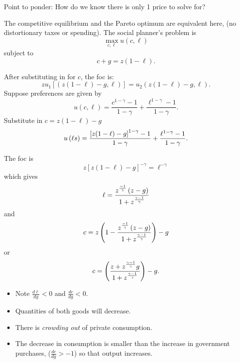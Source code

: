 \documentclass{sebase}
\begin{document}
Point to ponder: How do we know there is only 1 price to solve for?

\pagebreak

The competitive equilibrium and the Pareto optimum are equivalent here, (no
distortionary taxes or spending). The social planner's problem is 
\begin{equation*}
\underset{c,\ell }{\max }u\left( c,\ell \right)
\end{equation*}%
subject to 
\begin{equation*}
c+g=z(1-\ell ).
\end{equation*}

After substituting in for $c$, the foc is: 
\begin{equation*}
zu_{1}\left[ \left( z\left( 1-\ell \right) -g,\ell \right) \right]
=u_{2}\left( z\left( 1-\ell \right) -g,\ell \right) .
\end{equation*}%
Suppose preferences are given by 
\begin{equation*}
u\left( c,\ell \right) =\frac{c^{1-\gamma }-1}{1-\gamma }+\frac{\ell
^{1-\gamma }-1}{1-\gamma }.
\end{equation*}%
Substitute in $c=z(1-\ell )-g$ 
\begin{equation*}
u\left( \ell s\right) =\frac{\left[ z(1-\ell )-g\right] ^{1-\gamma }-1}{%
1-\gamma }+\frac{\ell ^{1-\gamma }-1}{1-\gamma }.
\end{equation*}%
\pagebreak

The foc is%
\begin{equation*}
z\left[ z(1-\ell )-g\right] ^{-\gamma }=\ell ^{-\gamma }
\end{equation*}%
which gives 
\begin{equation*}
\ell =\frac{z^{\frac{-1}{\gamma }}\left( z-g\right) }{1+z^{\frac{\gamma -1}{%
\gamma }}}
\end{equation*}%
and%
\begin{equation*}
c=z\left( 1-\frac{z^{\frac{-1}{\gamma }}\left( z-g\right) }{1+z^{\frac{%
\gamma -1}{\gamma }}}\right) -g
\end{equation*}%
or%
\begin{equation*}
c=\left( \frac{z+z^{\frac{\gamma -1}{\gamma }}g}{1+z^{\frac{\gamma -1}{%
\gamma }}}\right) -g.
\end{equation*}%
\pagebreak

\begin{itemize}
\item Note $\frac{d\ell }{dg}<0$ and $\frac{dc}{dg}<0.$

\item Quantities of both goods will decrease.

\item There is \textit{crowding out} of private consumption.

\item The decrease in consumption is smaller than the increase in government
purchases, ($\frac{dc}{dg}>-1$) so that output increases.
\end{itemize}
\end{document}
